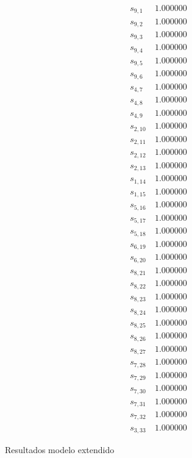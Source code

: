 \documentclass[journal, 10pt]{IEEEtran}
\begin{document}
\begin{table}%
	\begin{align*}
		s_{9,1}&   \     1.000000\\        
		s_{9,2}&   \     1.000000\\          
		s_{9,3}&   \     1.000000\\            
		s_{9,4}&   \     1.000000\\           
		s_{9,5}&   \     1.000000\\           
		s_{9,6}&   \     1.000000\\          
		s_{4,7}&   \     1.000000\\        
		s_{4,8}&   \     1.000000\\         
		s_{4,9}&   \     1.000000\\            
	 s_{2,10}&     \   1.000000\\           
	 s_{2,11}&     \   1.000000\\            
	 s_{2,12}&     \   1.000000\\            
	 s_{2,13}&     \   1.000000\\         
	 s_{1,14}&     \   1.000000\\            
	 s_{1,15}&     \   1.000000\\           
	 s_{5,16}&     \   1.000000\\            
	 s_{5,17}&     \   1.000000\\         
	 s_{5,18}&     \   1.000000\\          
	 s_{6,19}&     \   1.000000\\            
	 s_{6,20}&     \   1.000000\\            
	 s_{8,21}&     \   1.000000\\           
	 s_{8,22}&     \   1.000000\\            
	 s_{8,23}&     \   1.000000\\            
	 s_{8,24}&     \   1.000000\\           
	 s_{8,25}&     \   1.000000\\            
	 s_{8,26}&     \   1.000000\\           
	 s_{8,27}&     \   1.000000\\            
	 s_{7,28}&     \   1.000000\\         
	 s_{7,29}&     \   1.000000\\         
	 s_{7,30}&     \   1.000000\\          
	 s_{7,31}&     \   1.000000\\        
	 s_{7,32}&     \   1.000000\\       
	 s_{3,33}&     \   1.000000 
	\end{align*}
\caption{Resultados modelo extendido}
\label{table2}
\end{table}
\end{document}
